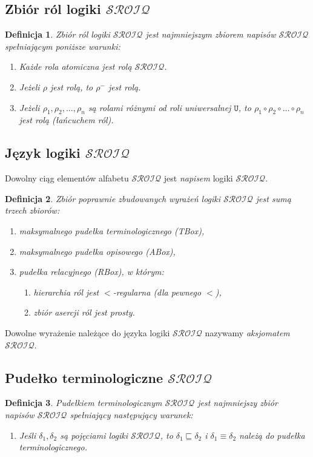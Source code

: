 \documentclass[12pt]{article}
\newtheorem{definicja}{Definicja}
\begin{document}
\subsection{Zbiór ról logiki $\mathcal{SROIQ}$}
%
\begin{definicja}
\label{ROLESROIQ}
Zbiór ról logiki $\mathcal{SROIQ}$ jest najmniejszym zbiorem napisów $\mathcal{SROIQ}$ spełniającym poniższe warunki:
%
\begin{enumerate}
\item Każde rola atomiczna jest rolą $\mathcal{SROIQ}$.
%
\item Jeżeli $\rho$ jest rolą, to $\rho^{-}$ jest rolą.
%
\item Jeżeli $\rho_{1}, \rho_{2}, \dots, \rho_{n}$ są rolami różnymi od roli uniwersalnej $\texttt{U}$, to  $\rho_{1} \circ \rho_{2} \circ \dots \circ \rho_{n}$ jest rolą (łańcuchem ról).
\end{enumerate}
\end{definicja}
%

\subsection{Język logiki $\mathcal{SROIQ}$}
%
Dowolny ciąg elementów alfabetu $\mathcal{SROIQ}$ jest \emph{napisem} logiki $\mathcal{SROIQ}$.
%
\begin{definicja}
\label{PZWSROIQ}
Zbiór poprawnie zbudowanych wyrażeń logiki $\mathcal{SROIQ}$ jest sumą trzech zbiorów:
\begin{enumerate}
	\item maksymalnego pudełka terminologicznego (TBox),
	\item maksymalnego pudełka opisowego (ABox),
	\item pudełka relacyjnego (RBox), w którym:
	\begin{enumerate}
		\item hierarchia ról jest $<$-regularna (dla pewnego $<$),
		\item zbiór asercji ról jest prosty.
	\end{enumerate}
\end{enumerate}
\end{definicja}
%
Dowolne wyrażenie należące do języka logiki  $\mathcal{SROIQ}$ nazywamy \emph{aksjomatem} $\mathcal{SROIQ}$.
%


\subsection[shrink=0.9]{Pudełko terminologiczne $\mathcal{SROIQ}$}
%
\begin{definicja}
\label{TBoxSROIQ}
Pudełkiem terminologicznym $\mathcal{SROIQ}$ jest najmniejszy zbiór napisów $\mathcal{SROIQ}$ spełniający następujący warunek:
%
\begin{enumerate}
\item \label{item:TBox1}  Jeśli $\delta_{1}, \delta_{2}$ są pojęciami logiki $\mathcal{SROIQ}$, to $\delta_{1} \sqsubseteq \delta_{2}$ i $\delta_{1} \equiv \delta_{2}$ należą do pudełka terminologicznego.
\end{enumerate}
\end{definicja}
%
\end{document}
